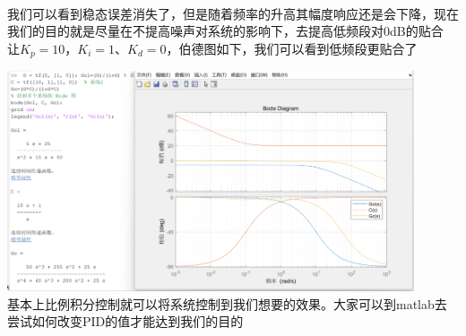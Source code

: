 \documentclass[UTF8,a4paper,12pt]{ctexart}
\begin{document}
\begin{notitlebox}
\begin{flushleft}
        \\我们可以看到稳态误差消失了，但是随着频率的升高其幅度响应还是会下降，现在我们的目的就是尽量在不提高噪声对系统的影响下，去提高低频段对0dB的贴合\\
        让$K_p=10$，$K_i=1$、$K_d=0$，伯德图如下，我们可以看到低频段更贴合了
        \par \includegraphics[width=12cm]{picture/C_10_I_1.png}
        \\基本上比例积分控制就可以将系统控制到我们想要的效果。大家可以到matlab去尝试如何改变PID的值才能达到我们的目的
      \end{flushleft}
      

    \end{notitlebox}
\end{document}
